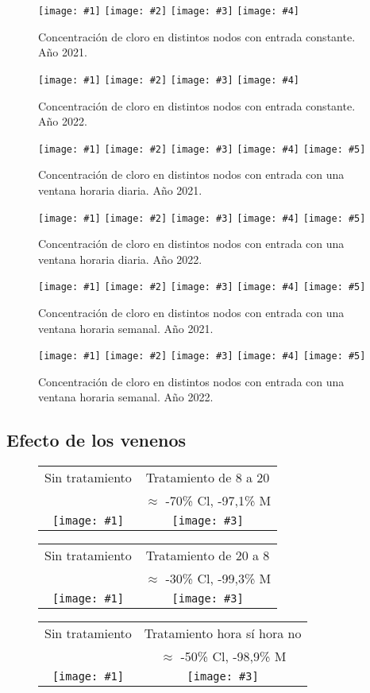 \documentclass[review,authoryear]{elsarticle}
\newcommand{\FIGIIC}[5]
{
	\begin{figure}[ht!]
		\centering
		\begin{tabular}{cc}
			#2&#4\\
			&#5\\
			\texttt{[image: \#1]}&
			\texttt{[image: \#3]}
		\end{tabular}
	\end{figure}
}
\newcommand{\FIGIV}[6]
{
	\begin{figure}[ht!]
		\centering
		\texttt{[image: \#1]}
		\texttt{[image: \#2]}
		\texttt{[image: \#3]}
		\texttt{[image: \#4]}
		\caption{#5.\label{#6}}
	\end{figure}
}
\newcommand{\FIGV}[7]
{
	\begin{figure}[ht!]
		\centering
		\texttt{[image: \#1]}
		\texttt{[image: \#2]}
		\texttt{[image: \#3]}
		\texttt{[image: \#4]}
		\texttt{[image: \#5]}
		\caption{#6.\label{#7}}
	\end{figure}
}
\begin{document}
\FIGIV{24-2021-chlorine-constant-0.eps}{24-2021-chlorine-constant-2.eps}
{24-2021-chlorine-constant-6665.eps}{24-2021-chlorine-constant-172.eps}
{Concentración de cloro en distintos nodos con entrada constante. Año 2021}
{Fig242021ChlorineConstant}

\FIGIV{24-2022-chlorine-constant-0.eps}{24-2022-chlorine-constant-2.eps}
{24-2022-chlorine-constant-68.eps}{24-2022-chlorine-constant-172.eps}
{Concentración de cloro en distintos nodos con entrada constante. Año 2022}
{Fig242022ChlorineConstant}

\FIGV{24-2021-chlorine-day-0.eps}{24-2021-chlorine-day-2.eps}
{24-2021-chlorine-day-65.eps}{24-2021-chlorine-day-6665.eps}
{24-2021-chlorine-day-172.eps}
{Concentración de cloro en distintos nodos con entrada con una ventana horaria
diaria. Año 2021}{Fig242021ChlorineDay}

\FIGV{24-2022-chlorine-day-0.eps}{24-2022-chlorine-day-2.eps}
{24-2022-chlorine-day-6634.eps}{24-2022-chlorine-day-68.eps}
{24-2022-chlorine-day-172.eps}
{Concentración de cloro en distintos nodos con entrada con una ventana horaria
diaria. Año 2022}{Fig242022ChlorineDay}

\FIGV{24-2021-chlorine-week-0.eps}{24-2021-chlorine-week-2.eps}
{24-2021-chlorine-week-68.eps}{24-2021-chlorine-week-123.eps}
{24-2021-chlorine-week-172.eps}
{Concentración de cloro en distintos nodos con entrada con una ventana horaria
semanal. Año 2021}{Fig242021ChlorineWeek}

\FIGV{24-2022-chlorine-week-0.eps}{24-2022-chlorine-week-2.eps}
{24-2022-chlorine-week-6634.eps}{24-2022-chlorine-week-139.eps}
{24-2022-chlorine-week-172.eps}
{Concentración de cloro en distintos nodos con entrada con una ventana horaria
semanal. Año 2022}{Fig242022ChlorineWeek}

\clearpage
\subsection{Efecto de los venenos}

\FIGIIC{2022-mussel-constant.pdf}{Sin tratamiento}
{24-2021-chlorine-day.pdf}
{Tratamiento de 8 a 20}{$\approx$ -70\% Cl, -97,1\% M}

\FIGIIC{2022-mussel-constant.pdf}{Sin tratamiento}
{24-2021-chlorine-dayb.pdf}
{Tratamiento de 20 a 8}{$\approx$ -30\% Cl, -99,3\% M}

\FIGIIC{2022-mussel-constant.pdf}{Sin tratamiento}
{24-2021-chlorine-hour.pdf}
{Tratamiento hora sí hora no}{$\approx$ -50\% Cl, -98,9\% M}
\end{document}
